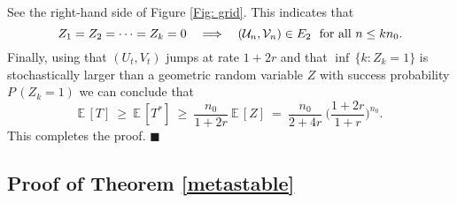  See the right-hand side of Figure \ref{Fig: grid}.
 This indicates that
 $$ Z_1 = Z_2 = \cdots = Z_k = 0 \quad \Longrightarrow \quad ({\mathcal U}_n, {\mathcal V}_n) \in E_2 \ \ \hbox{for all} \ n \leq k n_0. $$
 Finally, using that $(U_t, V_t)$ jumps at rate $1 + 2r$ and that $\inf \,\{k : Z_k = 1 \}$ is stochastically larger than a
 geometric random variable $Z$ with success probability $P \,(Z_k = 1)$ we can conclude that
 $$ {\mathbb{E}} \,[T] \ \geq \ {\mathbb{E}} \,[T^*] \ \geq \ \frac{n_0}{1 + 2r} \ {\mathbb{E}} \,[Z] \ = \
    \frac{n_0}{2 + 4r} \ \bigg(\frac{1 + 2r}{1 + r} \bigg)^{n_0}. $$
 This completes the proof. \hspace{2mm} $\blacksquare$

\subsection*{Proof of Theorem \ref{metastable}}


